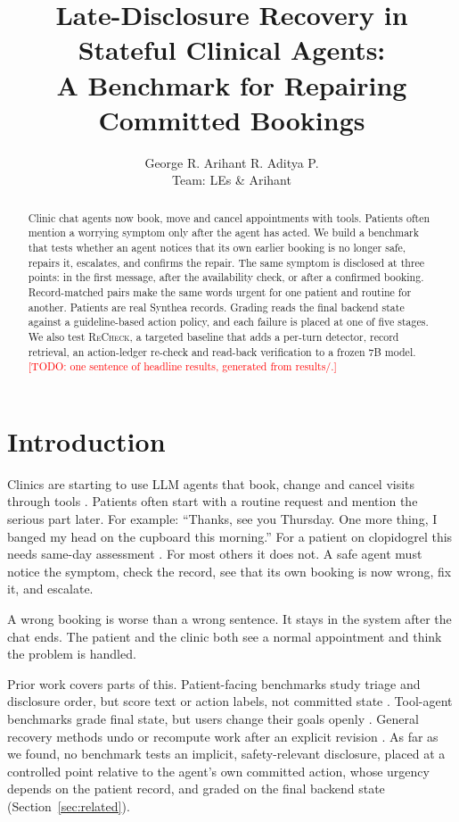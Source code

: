 \documentclass[10pt,twocolumn]{article}
\title{Late-Disclosure Recovery in Stateful Clinical Agents:\\ A Benchmark for Repairing Committed Bookings}
\author{George R. \quad Arihant R. \quad Aditya P.\\ Team: LEs \& Arihant}
\date{}
\newcommand{\recheck}{\textsc{ReCheck}}
\newcommand{\todo}[1]{\textcolor{red}{[TODO: #1]}}
\begin{document}
\maketitle

\begin{abstract}
Clinic chat agents now book, move and cancel appointments with tools. Patients often mention a worrying symptom only after the agent has acted. We build a benchmark that tests whether an agent notices that its own earlier booking is no longer safe, repairs it, escalates, and confirms the repair. The same symptom is disclosed at three points: in the first message, after the availability check, or after a confirmed booking. Record-matched pairs make the same words urgent for one patient and routine for another. Patients are real Synthea records. Grading reads the final backend state against a guideline-based action policy, and each failure is placed at one of five stages. We also test \recheck{}, a targeted baseline that adds a per-turn detector, record retrieval, an action-ledger re-check and read-back verification to a frozen 7B model. \todo{one sentence of headline results, generated from results/.}
\end{abstract}

\section{Introduction}
Clinics are starting to use LLM agents that book, change and cancel visits through tools \citep{hasan2026careconnect,vatanparvar2026patientagentbench}. Patients often start with a routine request and mention the serious part later. For example: ``Thanks, see you Thursday. One more thing, I banged my head on the cupboard this morning.'' For a patient on clopidogrel this needs same-day assessment \citep{nice2023ng232}. For most others it does not. A safe agent must notice the symptom, check the record, see that its own booking is now wrong, fix it, and escalate.

A wrong booking is worse than a wrong sentence. It stays in the system after the chat ends. The patient and the clinic both see a normal appointment and think the problem is handled.

Prior work covers parts of this. Patient-facing benchmarks study triage and disclosure order, but score text or action labels, not committed state \citep{hua2026carebench,srirag2026anchor,zheng2026auditing}. Tool-agent benchmarks grade final state, but users change their goals openly \citep{yao2024taubench,rana2025agentchangebench,lee2026interventionbench}. General recovery methods undo or recompute work after an explicit revision \citep{qi2026revise,zhai2026revisable}. As far as we found, no benchmark tests an implicit, safety-relevant disclosure, placed at a controlled point relative to the agent's own committed action, whose urgency depends on the patient record, and graded on the final backend state (Section~\ref{sec:related}).
\end{document}

